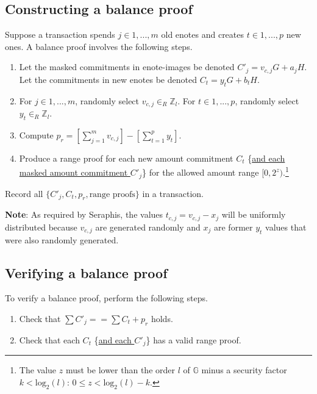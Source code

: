 \subsection{Constructing a balance proof}
\label{subsec:balance-proofs-construction}

Suppose a transaction spends $j \in 1,...,m$ old enotes and creates $t \in 1,...,p$ new ones. A balance proof involves the following steps.

\begin{enumerate}
    \item Let the masked commitments in enote-images be denoted $C'_j = v_{c,j} G + a_j H$. Let the commitments in new enotes be denoted $C_t = y_t G + b_t H$.

    \item For $j \in 1,...,m$, randomly select $v_{c,j} \in_R \mathbb{Z}_l$. For $t \in 1,...,p$, randomly select $y_t \in_R \mathbb{Z}_l$.

    \item Compute $p_r = [\sum^{m}_{j=1} v_{c,j}] - [\sum^{p}_{t=1} y_t]$.

    \item Produce a range proof for each new amount commitment $C_t$ \{\ul{and each masked amount commitment $C'_j$}\} for the allowed amount range $[0,2^z)$.\footnote{The value $z$ must be lower than the order $l$ of $\mathbb{G}$ minus a security factor $k < \textrm{log}_2(l)$: $0 \leq z < \textrm{log}_2(l) - k$.}
\end{enumerate}

Record all $\{C'_j, C_t, p_r, \textrm{range proofs}\}$ in a transaction.

\textbf{Note}: As required by Seraphis, the values $t_{c,j} = v_{c,j} - x_j$ will be uniformly distributed because $v_{c,j}$ are generated randomly and $x_j$ are former $y_t$ values that were also randomly generated.


\subsection{Verifying a balance proof}
\label{subsec:balance-proofs-verification}

To verify a balance proof, perform the following steps.

\begin{enumerate}
    \item Check that $\sum C'_j == \sum C_t + p_r$ holds.

    \item Check that each $C_t$ \{\ul{and each $C'_j$}\} has a valid range proof.
\end{enumerate}

